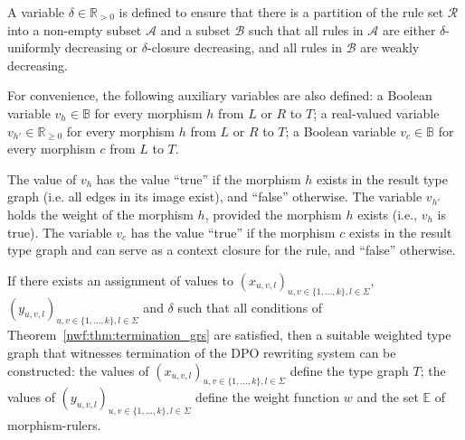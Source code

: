 A variable $\delta \in \mathbb{R}_{>0}$ is defined to ensure that there is
a partition of the rule set $\mathcal{R}$ into a non-empty subset $\mathcal{A}$ and a subset $\mathcal{B}$ such that all rules in $\mathcal{A}$ are either $\delta$-uniformly decreasing or $\delta$-closure decreasing, and all rules in $\mathcal{B}$ are weakly decreasing.

For convenience, the following auxiliary variables are also defined: a Boolean variable $v_h \in \mathbb{B}$ for every morphism $h$ from $L$ or $R$ to $T$; a real-valued variable $v_{h'} \in \mathbb{R}_{\geq 0}$ for every morphism $h$ from $L$ or $R$ to $T$; a Boolean variable $v_c \in \mathbb{B}$ for every morphism $c$ from $L$ to $T$.

The value of $v_h$ has the value \enquote{true} if the morphism $h$ exists in the result type graph (i.e. all edges in its image exist), and \enquote{false} otherwise.
The variable $v_{h'}$ holds the weight of the morphism $h$, provided the morphism $h$ exists (i.e., $v_h$ is true).
The variable $v_c$ has the value \enquote{true} if the morphism $c$ exists in the result type graph and can serve as a context closure for the rule, and \enquote{false} otherwise.

If there exists an assignment of values to \( (x_{u,v,l})_{u,v \in \{1,...,k\}, l \in \Sigma} \), \( (y_{u,v,l})_{u,v \in \{1,...,k\}, l \in \Sigma} \) and $\delta$ such that all conditions of Theorem~\ref{nwf:thm:termination_grs} are satisfied, then a suitable weighted type graph that witnesses termination of the DPO rewriting system can be constructed: the values of \( (x_{u,v,l})_{u,v \in \{1,...,k\}, l \in \Sigma} \) define the type graph $T$; the values of \( (y_{u,v,l})_{u,v \in \{1,...,k\}, l \in \Sigma} \) define the weight function $w$ and the set $\mathbb{E}$ of morphism-rulers.     